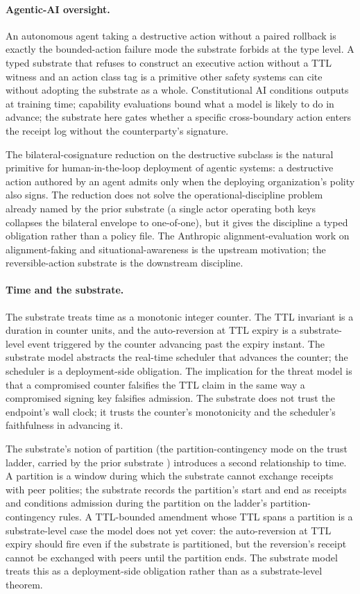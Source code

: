 \paragraph{Agentic-AI oversight.}
An autonomous agent taking a destructive action without a paired
rollback is exactly the bounded-action failure mode the substrate
forbids at the type level. A typed substrate that refuses to
construct an executive action without a TTL witness and an action
class tag is a primitive other safety systems can cite without
adopting the substrate as a whole. Constitutional AI conditions
outputs at training time; capability evaluations bound what a model
is likely to do in advance; the substrate here gates whether a
specific cross-boundary action enters the receipt log without the
counterparty's signature.

The bilateral-cosignature reduction on the destructive subclass is
the natural primitive for human-in-the-loop deployment of agentic
systems: a destructive action authored by an agent admits only when
the deploying organization's polity also signs. The reduction does
not solve the operational-discipline problem already named by the
prior substrate \cite{programmableSovereigntyAnonymous}
(a single actor operating both keys collapses the bilateral envelope
to one-of-one), but it gives the discipline a typed obligation rather
than a policy file. The Anthropic alignment-evaluation work on
alignment-faking and situational-awareness is the upstream
motivation; the reversible-action substrate is the downstream
discipline.

\paragraph{Time and the substrate.}
The substrate treats time as a monotonic integer counter. The TTL
invariant is a duration in counter units, and the auto-reversion at
TTL expiry is a substrate-level event triggered by the counter
advancing past the expiry instant. The substrate model abstracts the
real-time scheduler that advances the counter; the scheduler is a
deployment-side obligation. The implication for the threat model is
that a compromised counter falsifies the TTL claim in the same way a
compromised signing key falsifies admission. The substrate does not
trust the endpoint's wall clock; it trusts the counter's monotonicity
and the scheduler's faithfulness in advancing it.

The substrate's notion of partition (the partition-contingency mode on
the trust ladder, carried by the prior substrate
\cite{programmableSovereigntyAnonymous}) introduces a second
relationship to time. A partition is a window during which the
substrate cannot exchange receipts with peer polities; the substrate
records the partition's start and end as receipts and conditions
admission during the partition on the ladder's partition-contingency
rules. A TTL-bounded amendment whose TTL spans a partition is a
substrate-level case the model does not yet cover: the auto-reversion
at TTL expiry should fire even if the substrate is partitioned, but
the reversion's receipt cannot be exchanged with peers until the
partition ends. The substrate model treats this as a deployment-side
obligation rather than as a substrate-level theorem.

